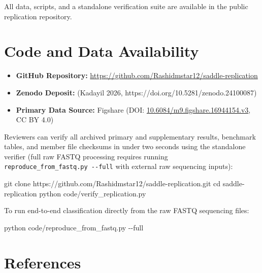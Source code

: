 \documentclass[
]{article}
\newenvironment{Shaded}{}{}
\newcommand{\AttributeTok}[1]{\textcolor[rgb]{0.49,0.56,0.16}{#1}}
\newcommand{\BuiltInTok}[1]{\textcolor[rgb]{0.00,0.50,0.00}{#1}}
\newcommand{\ExtensionTok}[1]{#1}
\newcommand{\FunctionTok}[1]{\textcolor[rgb]{0.02,0.16,0.49}{#1}}
\newcommand{\NormalTok}[1]{#1}
\providecommand{\tightlist}{%
  \setlength{\itemsep}{0pt}\setlength{\parskip}{0pt}}
\begin{document}
All data, scripts, and a standalone verification suite are available in
the public replication repository.

\section{Code and Data Availability}\label{code-and-data-availability}

\begin{itemize}
\tightlist
\item
  \textbf{GitHub Repository:}
  \url{https://github.com/Rashidmstar12/saddle-replication}
\item
  \textbf{Zenodo Deposit:} (Kadayil 2026,
  https://doi.org/10.5281/zenodo.24100087)
\item
  \textbf{Primary Data Source:} Figshare (DOI:
  \href{https://doi.org/10.6084/m9.figshare.16944154.v3}{10.6084/m9.figshare.16944154.v3},
  CC BY 4.0)
\end{itemize}

Reviewers can verify all archived primary and supplementary results,
benchmark tables, and member file checksums in under two seconds using
the standalone verifier (full raw FASTQ processing requires running
\texttt{reproduce\_from\_fastq.py\ -\/-full} with external raw
sequencing inputs):

\begin{Shaded}
\begin{Highlighting}[]
\FunctionTok{git}\NormalTok{ clone https://github.com/Rashidmstar12/saddle{-}replication.git}
\BuiltInTok{cd}\NormalTok{ saddle{-}replication}
\ExtensionTok{python}\NormalTok{ code/verify\_replication.py}
\end{Highlighting}
\end{Shaded}

To run end-to-end classification directly from the raw FASTQ sequencing
files:

\begin{Shaded}
\begin{Highlighting}[]
\ExtensionTok{python}\NormalTok{ code/reproduce\_from\_fastq.py }\AttributeTok{{-}{-}full}
\end{Highlighting}
\end{Shaded}

\section*{References}\label{references}
\end{document}
